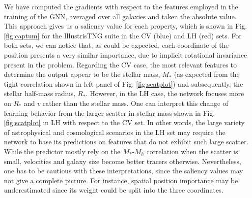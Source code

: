 \documentclass[twocolumn]{aastex631}
\begin{document}
We have computed the gradients with respect to the features employed in the training of the GNN, averaged over all galaxies and taken the absolute value. This approach gives us a saliency value for each property, which is shown in Fig. \ref{fig:captum} for the IllustrisTNG suite in the CV (blue) and LH (red) sets. For both sets, we can notice that, as could be expected, each coordinate of the position presents a very similar importance, due to implicit rotational invariance present in the problem. Regarding the CV case, the most relevant features to determine the output appear to be the stellar mass, $M_*$ (as expected from the tight correlation shown in left panel of Fig. \ref{fig:scatplot}) and subsequently, the stellar half-mass radius, $R_*$. However, in the LH case, the network focuses more on $R_*$ and $v$ rather than the stellar mass. One can interpret this change of learning behavior from the larger scatter in stellar mass shown in Fig. \ref{fig:scatplot} in LH with respect to the CV set. In other words, the large variety of astrophysical and cosmological scenarios in the LH set may require the network to base its predictions on features that do not exhibit such large scatter. While the predictor mostly rely on the $M_*$-$M_h$ correlation when the scatter is small, velocities and galaxy size become better tracers otherwise. Nevertheless, one has to be cautious with these interpretations, since the saliency values may not give a complete picture. For instance, spatial position importance may be underestimated since its weight could be split into the three coordinates.
\end{document}
